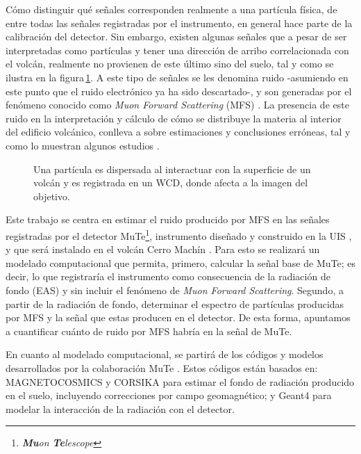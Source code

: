 \documentclass[12pt]{report}
\begin{document}
Cómo distinguir qué señales corresponden realmente a una partícula física, de entre todas
las señales registradas por el instrumento, en general hace parte de la calibración del
detector. Sin embargo, existen algunas señales que a pesar de ser interpretadas como
partículas y tener una dirección de arribo correlacionada con el volcán, realmente
no provienen de este último sino del suelo, tal y como se ilustra en la 
figura\,\ref{fig:scatteredNoise}. A este tipo de señales se les denomina ruido
-asumiendo en este punto que el ruido electrónico ya ha sido descartado-, y son
generadas por el fenómeno conocido como {\it Muon Forward Scattering} (MFS) \cite{gomez2017forward}. 
La presencia de este ruido en la interpretación y cálculo de cómo se distribuye la 
materia al interior del edificio volcánico, conlleva a sobre estimaciones y 
conclusiones erróneas, tal y como lo muestran algunos estudios \cite{gomez2017forward,bonechi2020atmospheric,asorey2017muon}.

\begin{figure}[h]
    \centering
    
    \caption{Una partícula es dispersada al interactuar con la superficie de un volcán y es registrada en un WCD, donde afecta a la imagen del objetivo.}
    \label{fig:scatteredNoise}
\end{figure}

Este trabajo se centra en estimar el ruido producido por MFS en las señales registradas 
por el detector MuTe\footnote{\textit{\textbf{Mu}on \textbf{Te}lescope}}, instrumento diseñado y construido en la UIS \cite{pena2019calibration,rodriguez2018minimute,sanabria2018mute}, y que será
instalado en el volcán Cerro Machín \cite{vesga2018inversion,balaguera2017astroparticle}. Para esto se realizará un modelado
computacional que permita, primero, calcular la señal base de MuTe; es decir, lo que
registraría el instrumento como consecuencia de la radiación de fondo (EAS) y sin
incluir el fenómeno de {\it Muon Forward Scattering}. Segundo, a partir de la 
radiación de fondo, determinar el espectro de partículas producidas por MFS y la señal
que estas producen en el detector. De esta forma, apuntamos a cuantificar cuánto de ruido 
por MFS habría en la señal de MuTe.

En cuanto al modelado computacional, se 
partirá de los códigos y modelos desarrollados por la colaboración MuTe \cite{msd_phd2019,vasquez2019simulated}. 
Estos códigos están basados en: MAGNETOCOSMICS \cite{magnetocosmics,desorgher2003geant4} y CORSIKA \cite{heck1998corsika} para estimar
el fondo de radiación producido en el suelo, incluyendo correcciones por campo 
geomagnético; y Geant4 \cite{agostinelli2003geant4,calderon2015geant4} para modelar la interacción de la radiación 
con el detector.
\end{document}
